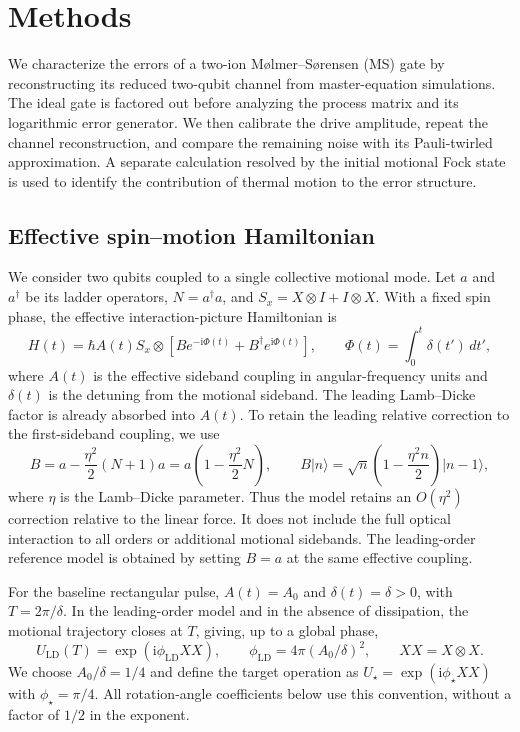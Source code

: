 \documentclass[a4paper,11pt]{article}
\newcommand{\ii}{\mathrm{i}}
\newcommand{\ket}[1]{\lvert #1\rangle}
\begin{document}
\setcounter{section}{1}
\section{Methods}
\label{sec:methods}

We characterize the errors of a two-ion M{\o}lmer--S{\o}rensen (MS) gate
by reconstructing its reduced two-qubit channel from master-equation
simulations. The ideal gate is factored out before analyzing the process
matrix and its logarithmic error generator. We then calibrate the drive
amplitude, repeat the channel reconstruction, and compare the remaining
noise with its Pauli-twirled approximation. A separate calculation resolved
by the initial motional Fock state is used to identify the contribution of
thermal motion to the error structure.

\subsection{Effective spin--motion Hamiltonian}
\label{subsec:hamiltonian}

We consider two qubits coupled to a single collective motional mode.
Let $a$ and $a^\dagger$ be its ladder operators, $N=a^\dagger a$, and
$S_x=X\otimes I+I\otimes X$. With a fixed spin phase, the effective
interaction-picture Hamiltonian is
\begin{equation}
 H(t)=\hbar A(t)S_x\otimes
 \left[B e^{-\ii\Phi(t)}+B^\dagger e^{\ii\Phi(t)}\right],
 \qquad \Phi(t)=\int_0^t\delta(t')\,dt',
 \label{eq:methods_hamiltonian}
\end{equation}
where $A(t)$ is the effective sideband coupling in angular-frequency units
and $\delta(t)$ is the detuning from the motional sideband. The leading
Lamb--Dicke factor is already absorbed into $A(t)$. To retain the leading
relative correction to the first-sideband coupling, we use
\begin{equation}
 B=a-\frac{\eta^2}{2}(N+1)a
   =a\left(1-\frac{\eta^2}{2}N\right),
 \qquad
 B\ket{n}=\sqrt n\left(1-\frac{\eta^2 n}{2}\right)\ket{n-1},
 \label{eq:methods_B}
\end{equation}
where $\eta$ is the Lamb--Dicke parameter. Thus the model retains an
$O(\eta^2)$ correction relative to the linear force. It does not include
the full optical interaction to all orders or additional motional
sidebands. The leading-order reference model is obtained by setting
$B=a$ at the same effective coupling.

For the baseline rectangular pulse, $A(t)=A_0$ and $\delta(t)=\delta>0$,
with $T=2\pi/\delta$. In the leading-order model and in the absence of
dissipation, the motional trajectory closes at $T$, giving, up to a global
phase,
\begin{equation}
 U_{\mathrm{LD}}(T)=\exp(\ii\phi_{\mathrm{LD}}XX),
 \qquad \phi_{\mathrm{LD}}=4\pi(A_0/\delta)^2,
 \qquad XX=X\otimes X.
\end{equation}
We choose $A_0/\delta=1/4$ and define the target operation as
$U_\star=\exp(\ii\phi_\star XX)$ with $\phi_\star=\pi/4$.
All rotation-angle coefficients below use this convention, without a
factor of $1/2$ in the exponent.
\end{document}
